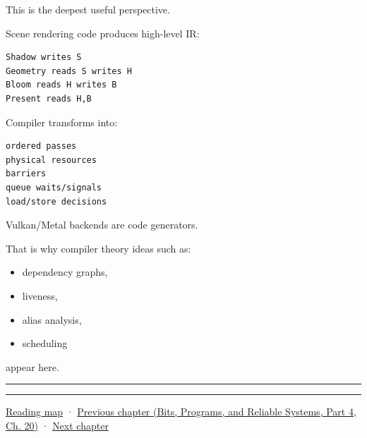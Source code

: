 This is the deepest useful perspective.

Scene rendering code produces high-level IR:

\begin{verbatim}
Shadow writes S
Geometry reads S writes H
Bloom reads H writes B
Present reads H,B
\end{verbatim}

Compiler transforms into:

\begin{verbatim}
ordered passes
physical resources
barriers
queue waits/signals
load/store decisions
\end{verbatim}

Vulkan/Metal backends are code generators.

That is why compiler theory ideas such as:

\begin{itemize}
\tightlist
\item
  dependency graphs,
\item
  liveness,
\item
  alias analysis,
\item
  scheduling
\end{itemize}

appear here.

\begin{center}\rule{0.5\linewidth}{0.5pt}\end{center}

\begin{center}\rule{0.5\linewidth}{0.5pt}\end{center}

\hyperref[volume-reading-map]{Reading map} · \href{../01-Bits-Programs-and-Reliable-Systems-P04/main.pdf\#nameddest=06-engine-ii-ch042-from-cartridge-bytes-to-a-reproducible-machine}{Previous chapter (Bits, Programs, and Reliable Systems, Part 4, Ch. 20)} · \hyperref[06-engine-ii-ch044-cross-backend-conversion-and-agreement]{Next chapter}
